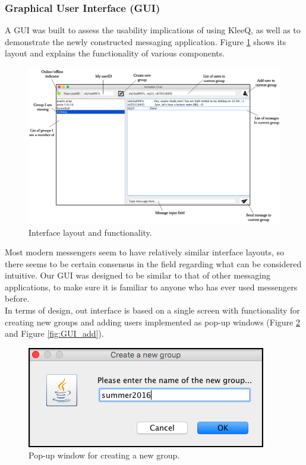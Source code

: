 \documentclass[a4paper, 12pt]{report}
\begin{document}
\subsubsection{Graphical User Interface (GUI)}
A GUI was built to assess the usability implications of using KleeQ, as well as to demonstrate the newly constructed messaging application. Figure \ref{fig:GUI} shows its layout and explains the functionality of various components.
\begin{figure}[H]
    \captionsetup{width=0.84\textwidth}
    \centering
    \includegraphics[width=0.94\linewidth]{pics/GUI.png}
    \caption{\label{fig:GUI} Interface layout and functionality.}
\end{figure}
Most modern messengers seem to have relatively similar interface layouts, so there seems to be certain consensus in the field regarding what can be considered intuitive. Our GUI was designed to be similar to that of other messaging applications, to make sure it is familiar to anyone who has ever used messengers before. \\

In terms of design, out interface is based on a single screen with functionality for creating new groups and adding users implemented as pop-up windows (Figure \ref{fig:GUI_create} and Figure \ref{fig:GUI_add}).

\begin{figure}[H]
    \captionsetup{width=0.84\textwidth}
    \centering
    \includegraphics[width=0.5\linewidth]{pics/GUI_create.png}
    \caption{\label{fig:GUI_create} Pop-up window for creating a new group.}
\end{figure}
\end{document}
